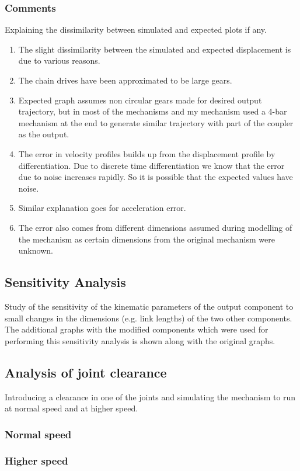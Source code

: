         \subsubsection{Comments}
            Explaining the dissimilarity between simulated and expected plots if any.
            \begin{enumerate}
                \item The slight dissimilarity between the simulated and expected displacement is due to various reasons.
                \item The chain drives have been approximated to be large gears.
                \item Expected graph assumes non circular gears made for desired output trajectory, but in most of the mechanisms and my mechanism used a 4-bar mechanism at the end to generate similar trajectory with part of the coupler as the output.
                \item The error in velocity profiles builds up from the displacement profile by differentiation. Due to discrete time differentiation we know that the error due to noise increases rapidly. So it is possible that the expected values have noise.
                \item Similar explanation goes for acceleration error.
                \item The error also comes from different dimensions assumed during modelling of the mechanism as certain dimensions from the original mechanism were unknown. 
            \end{enumerate}

    \subsection{Sensitivity Analysis}
        Study of the sensitivity of the kinematic parameters of the output component to small changes in the dimensions (e.g. link lengths) of the two other components. The additional graphs with the modified components which were used for performing this sensitivity analysis is shown along with the original graphs.

    \subsection{Analysis of joint clearance}
        Introducing a clearance in one of the joints and simulating the mechanism to run at normal speed and at higher speed. 

        \subsubsection{Normal speed}

        \subsubsection{Higher speed}